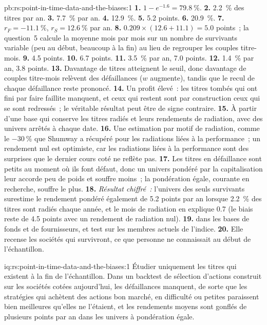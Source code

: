 \begin{solution}{pb:rs:point-in-time-data-and-the-biases:1}
\textbf{1.} $1 - e^{-1.6} = 79.8~\%$. \textbf{2.} 2.2~\% des titres par an. \textbf{3.} 7.7~\% par an. \textbf{4.} 12.9~\%.
\textbf{5.} 5.2 points. \textbf{6.} 20.9~\%. \textbf{7.} $r_F = -11.1~\%$, $r_S = 12.6~\%$ par an. \textbf{8.} $0.209 \times (12.6 +
11.1) = 5.0$ points~; la question~5 calcule la moyenne mois par mois sur un nombre de survivants variable (peu au début, beaucoup à la fin) au lieu
de regrouper les couples titre-mois. \textbf{9.} 4.5 points. \textbf{10.} 6.7 points. \textbf{11.} 3.5~\% par an, 7.0 points. \textbf{12.} 1.4~\%
par an, 3.8 points. \textbf{13.} Davantage de titres atteignent le seuil, donc davantage de couples titre-mois relèvent des défaillances ($w$ augmente), tandis que
le recul de chaque défaillance reste prononcé. \textbf{14.} Un profit élevé~: les titres tombés qui ont fini par faire faillite manquent, et ceux qui
restent sont par construction ceux qui se sont redressés~; le véritable résultat peut être de signe contraire. \textbf{15.} À partir d'une base qui
conserve les titres radiés et leurs rendements de radiation, avec des univers arrêtés à chaque date. \textbf{16.} Une estimation par motif
de radiation, comme le $-30~\%$ que Shumway a récupéré pour les radiations liées à la performance~; un rendement nul est optimiste, car les radiations liées à la performance sont
des surprises que le dernier cours coté ne reflète pas. \textbf{17.} Les titres en défaillance sont petits au moment où ils font défaut, donc un
univers pondéré par la capitalisation leur accorde peu de poids et souffre moins~; la pondération égale, courante en recherche, souffre le plus.
\textbf{18.} \emph{Résultat chiffré~:} l'univers des seuls survivants surestime le rendement pondéré également de 5.2 points par an lorsque 2.2~\%
des titres sont radiés chaque année, et le mois de radiation en explique 0.7 (le biais reste de 4.5 points avec un rendement de radiation
nul). \textbf{19.}  dans les bases de fonds et de fournisseurs, et test sur les membres actuels de l'indice. \textbf{20.} Elle recense les
sociétés qui survivront, ce que personne ne connaissait au début de l'échantillon.
\end{solution}

\begin{solution}{iq:rs:point-in-time-data-and-the-biases:1}
Étudier uniquement les titres qui existent à la fin de l'échantillon. Dans un backtest de sélection d'actions construit sur les sociétés cotées aujourd'hui,
les défaillances manquent, de sorte que les stratégies qui achètent des actions bon marché, en difficulté ou petites paraissent bien meilleures qu'elles ne l'étaient, et les rendements moyens
sont gonflés de plusieurs points par an dans les univers à pondération égale.
\end{solution}

